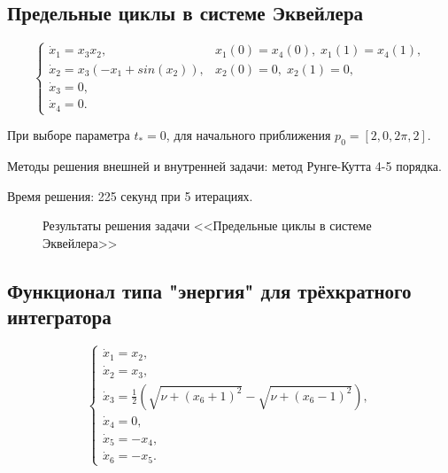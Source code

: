 \documentclass{article}
\begin{document}
\subsection{Предельные циклы в системе Эквейлера}

$$
\begin{cases}
\dot{x}_1=x_3x_2, &x_1(0)=x_4(0), \;x_1(1)=x_4(1),
\\
\dot{x}_2=x_3(-x_1+sin(x_2)), &x_2(0)=0, \;x_2(1)=0,
\\
\dot{x}_3=0, 
\\
\dot{x}_4=0.
\end{cases}	
$$

\noindent При выборе параметра $t_* = 0$, для начального приближения 
$
p_0 = [2, 0, 2\pi, 2].
$

Методы решения внешней и внутренней задачи: метод Рунге-Кутта 4-5 порядка.

Время решения: 225 секунд при 5 итерациях.

\begin{figure}[H]
\caption{Результаты решения задачи <<Предельные циклы в системе Эквейлера>>}
\label{ris:task2}
\end{figure}

\newpage

\subsection{Функционал типа "энергия" для трёхкратного интегратора}

$$
\begin{cases}
\dot{x}_1=x_2,
\\
\dot{x}_2=x_3,
\\
\dot{x}_3=\frac{1}{2}(\sqrt{\nu + (x_6+1)^2}-\sqrt{\nu + (x_6-1)^2}), 
\\
\dot{x}_4=0,
\\
\dot{x}_5=-x_4,
\\
\dot{x}_6=-x_5.
\end{cases}	
$$
\end{document}

